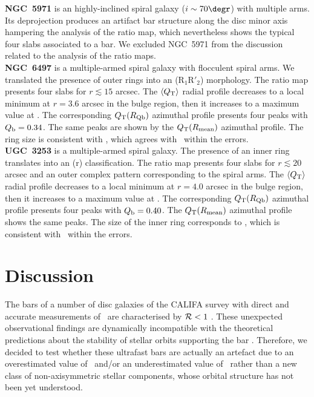 \documentclass{aa}
\begin{document}
\noindent \textbf{NGC~5971} is an highly-inclined spiral galaxy ($i\sim70\degr$) with multiple arms. Its deprojection produces an artifact bar structure along the disc minor axis hampering the analysis of the ratio map, which nevertheless shows the typical four slabs associated to a bar. We excluded NGC~5971 from the discussion related to the analysis of the ratio maps.\\

\noindent \textbf{NGC~6497} is a multiple-armed spiral galaxy with flocculent spiral arms. We translated the presence of outer rings into an (R$_1$R$'_2$) morphology. The ratio map presents four slabs for $r\lesssim15$ arcsec. The $\langle Q_{\rm T}\rangle$ radial profile decreases to a local minimum at $r=3.6$ arcsec in the bulge region, then it increases to a maximum value at \rqb. The corresponding $Q_{\rm T}(R_{\rm Qb})$ azimuthal profile presents four peaks with $Q_{\rm b}=0.34$. The same peaks are shown by the $Q_{\rm T}(R_{\rm mean})$ azimuthal profile. The ring size is consistent with \rmean, which agrees with \rqb\ within the errors.\\

\noindent \textbf{UGC~3253} is a multiple-armed spiral galaxy. The presence of an inner ring translates into an (r) classification. The ratio map presents four slabs for $r\lesssim20$ arcsec and an outer complex pattern corresponding to the spiral arms.  The $\langle Q_{\rm T}\rangle$ radial profile decreases to a local minimum at $r=4.0$ arcsec in the bulge region, then it increases to a maximum value at \rqb. The corresponding $Q_{\rm T}(R_{\rm Qb})$ azimuthal profile presents four peaks with $Q_{\rm b}=0.40$. The $Q_{\rm T}(R_{\rm mean})$ azimuthal profile shows the same peaks. The size of the inner ring corresponds to \rmean, which is consistent with \rqb\ within the errors.\\

\section{Discussion}
\label{sec:discussion}

The bars of a number of disc galaxies of the CALIFA survey with direct and accurate measurements of \omegabar\ are characterised by ${\cal R}<1$ \citep{Aguerri2015, Cuomo2019b}. These unexpected observational findings are dynamically incompatible with the theoretical predictions about the stability of stellar orbits supporting the bar \citep{Contopoulos1981}. Therefore, we decided to test whether these ultrafast bars are actually an artefact due to an overestimated value of \rbar\ and/or an underestimated value of \rcor\ rather than a new class of non-axisymmetric stellar components, whose orbital structure has not been yet understood.
\end{document}
